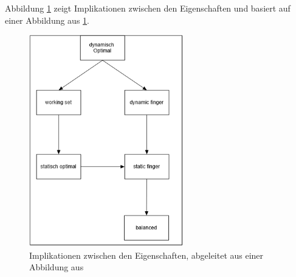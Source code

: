 \documentclass[a4paper,12pt]{article}
\begin{document}
\noindent Abbildung \ref{fig:upperBounds} zeigt Implikationen zwischen den Eigenschaften und basiert auf einer Abbildung aus \ref{fig:upperBounds}.

\begin{figure}[h]
	\centering
	\includegraphics[width= 0.6\textwidth]{"Medien/DynOpt/upperBounds"}
	\caption{Implikationen zwischen den Eigenschaften, abgeleitet aus einer Abbildung aus \cite{upperBounds} }
	\label{fig:upperBounds}
\end{figure}

\newpage


\end{document}
